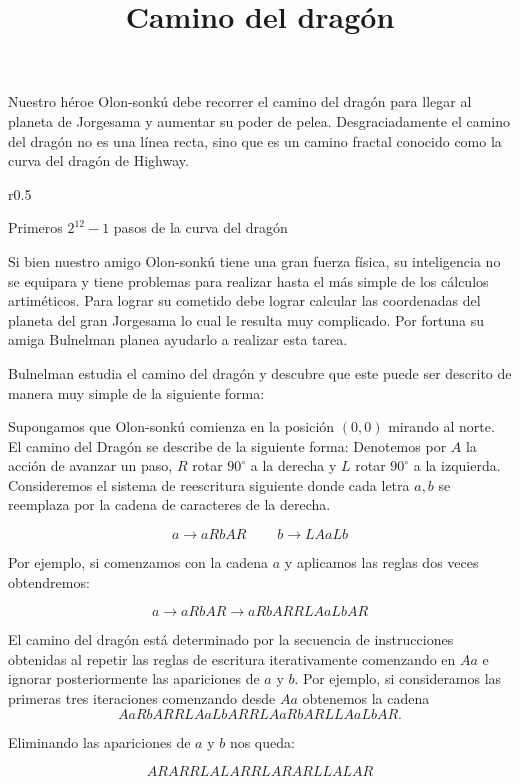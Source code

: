 \documentclass{oci}
\title{Camino del drag\'on}
\begin{document}
\begin{problemDescription}
Nuestro h\'eroe Olon-sonk\'u debe recorrer el camino del drag\'on para llegar al planeta de Jorgesama y aumentar su poder de pelea. Desgraciadamente el camino del drag\'on no es una l\'inea recta, sino que es un camino fractal conocido como la curva del drag\'on de Highway.


\begin{wrapfigure}{r}{0.5\textwidth}
	\begin{center}
			
		Primeros $2^{12}-1$ pasos de la curva del drag\'on
	\end{center}
\end{wrapfigure}

Si bien nuestro amigo Olon-sonk\'u tiene una gran fuerza f\'isica, su inteligencia no se equipara y tiene problemas para realizar hasta el m\'as simple de los c\'alculos artim\'eticos. Para lograr su cometido debe lograr calcular las coordenadas del planeta del gran Jorgesama lo cual le resulta muy complicado. Por fortuna su amiga Bulnelman planea ayudarlo a realizar esta tarea.

Bulnelman estudia el camino del drag\'on y descubre que este puede ser descrito de manera muy simple de la siguiente forma:

Supongamos que Olon-sonk\'u comienza en la posici\'on $(0,0)$ mirando al norte. El camino del Drag\'on se describe de la siguiente forma: Denotemos por $A$ la acci\'on de avanzar un paso, $R$ rotar $90^{\circ}$ a la derecha y $L$ rotar $90^{\circ}$ a la izquierda. Consideremos el sistema de reescritura siguiente donde cada letra $a,b$ se reemplaza por la cadena de caracteres de la derecha.

$$a \rightarrow aRbAR \ \ \ \ \ \ \ \ \ \   b \rightarrow LAaLb$$


Por ejemplo, si comenzamos con la cadena $a$ y aplicamos las reglas dos veces obtendremos:

$$a \rightarrow aRbAR \rightarrow aRbARRLAaLbAR $$

El camino del drag\'on est\'a determinado por la secuencia de instrucciones obtenidas al repetir las reglas de escritura iterativamente comenzando en $Aa$ e ignorar posteriormente las apariciones de $a$ y $b$. Por ejemplo, si consideramos las primeras tres iteraciones comenzando desde $Aa$ obtenemos la cadena $$AaRbARRLAaLbARRLAaRbARLLAaLbAR.$$

Eliminando las apariciones de $a$ y $b$ nos queda:

$$ARARRLALARRLARARLLALAR$$


\end{problemDescription}
\end{document}
